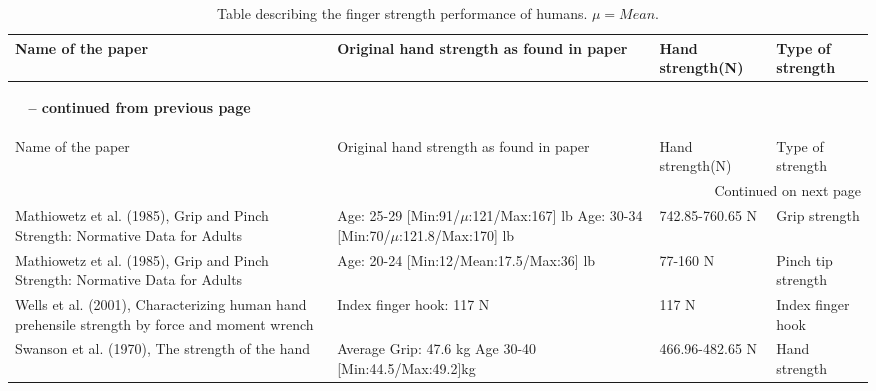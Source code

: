 \documentclass[main]{subfiles}
\begin{document}
\scriptsize
\setlength{\LTleft}{-30pt}%
\setlength{\LTright}{\LTleft}
\begin{longtable}{p{5.2cm}|p{4.2cm}|p{3.7cm}|p{1.7cm}}
\caption[Listing of hand strength studies]{Table describing the finger strength performance of humans. $\mu = Mean$.}\\
\toprule
Name of the paper & Original hand strength as found in paper & Hand strength(N) & Type of strength\\ 
\midrule
\label{hand-strength}
\endfirsthead

\multicolumn{4}{p{8cm}}
{{\bfseries \tablename\ \thetable{} -- continued from previous page}}\\ 
\hline
Name of the paper & Original hand strength as found in paper & Hand strength(N) & Type of strength\\ 
\midrule
\endhead

\hline \multicolumn{4}{r}{{Continued on next page}} \\ \hline 
\endfoot
\endlastfoot

Mathiowetz et al. (1985), Grip and Pinch Strength: Normative Data for Adults \cite{Mathiowetz1985} & Age: 25-29 [Min:91/$\mu$:121/Max:167] lb  \newline
Age: 30-34 [Min:70/$\mu$:121.8/Max:170] lb  & 742.85-760.65 N & Grip strength\\

Mathiowetz et al. (1985), Grip and Pinch Strength: Normative Data for Adults \cite{Mathiowetz1985} & Age: 20-24 [Min:12/Mean:17.5/Max:36] lb & 77-160 N & Pinch tip strength\\

Wells et al. (2001), Characterizing human hand prehensile strength by force and moment wrench \cite{Wells2001} & Index finger hook: 117 N & 117 N & Index finger hook\\
	
Swanson et al. (1970), The strength of the hand \cite{Swanson1970} & Average Grip: 47.6 kg \newline
Age 30-40 [Min:44.5/Max:49.2]kg & 466.96-482.65 N & Hand strength\\


\end{longtable}
\end{document}

